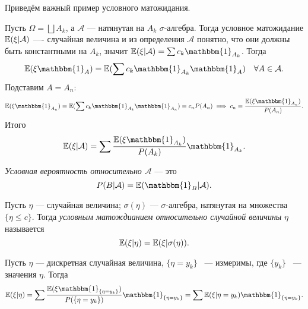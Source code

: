  Приведём важный пример условного матожидания. 

 \begin{example}
    Пусть $\Omega = \bigsqcup A_k$, а $\mathcal{A}$ --- натянутая на $A_k$ $\sigma$-алгебра.
    Тогда условное матожидание
     $\mathbb{E} (\xi | \mathcal{A})$ ---- случайная величина  и из определения $\mathcal{A}$ понятно, что они должны быть константными на $A_k$, значит $\EE (\xi | \mathcal{A}) = \sum c_k \mathbbm{1}_{A_k}$. Тогда
     $$\EE (\xi \mathbbm{1}_A) = \EE (\sum c_k \mathbbm{1}_{A_k} \mathbbm{1}_A) \quad \forall A\in \mathcal{A}.$$ Подставим $A = A_n$:
     $$\EE (\xi\mathbbm{1}_{A_n}) = \EE (\sum c_k \mathbbm{1}_{A_k} \mathbbm{1}_{A_n}) = c_n P(A_n) \Ra  c_n = \frac{\EE (\xi\mathbbm{1}_{A_n})}{P(A_n)}.$$
     Итого
     $$\EE (\xi | \mathcal{A}) = \sum \frac{\EE (\xi\mathbbm{1}_{A_k})}{P(A_k)} \mathbbm{1}_{A_k}.$$
 \end{example}

 \begin{definition}
     \textit{Условная вероятность относительно} $\mathcal{A}$ --- это
     $$P(B | \mathcal{A} ) = \EE (\mathbbm{1}_B | \mathcal{A}).$$
 \end{definition}

 \begin{definition}
     Пусть $\eta$ --- случайная величина; $\sigma(\eta)$ --- $\sigma$-алгебра, натянутая на множества $\{\eta \le c\}$. Тогда \textit{условным матождианием относительно случайной величины} $\eta$ называется
     $$\mathbb{E} (\xi | \eta) = \mathbb{E} (\xi | \sigma(\eta)).$$
 \end{definition}

 \begin{example}
     Пусть $\eta$ --- дискретная случайная величина, $\{\eta = y_k\}$ ~--- измеримы, где $\{y_k\}$ ~--- значения $\eta$. Тогда
     $$\EE (\xi | \eta) = \sum \frac{\EE (\xi \mathbbm{1}_{\{\eta = y_k\}})}{P(\{\eta = y_k\})} \mathbbm{1}_{\{\eta = y_k\}} =
         \sum \EE (\xi | \eta = y_k)\mathbbm{1}_{\{\eta = y_k\}}.$$
 \end{example}